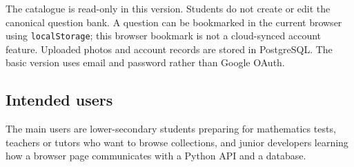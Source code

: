 The catalogue is read-only in this version. Students do not create or edit the canonical question bank. A question can be bookmarked in the current browser using \texttt{localStorage}; this browser bookmark is not a cloud-synced account feature. Uploaded photos and account records are stored in PostgreSQL. The basic version uses email and password rather than Google OAuth.

\subsection{Intended users}
The main users are lower-secondary students preparing for mathematics tests, teachers or tutors who want to browse collections, and junior developers learning how a browser page communicates with a Python API and a database.
